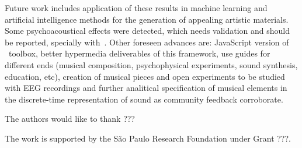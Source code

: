 Future work includes application of these results in machine learning and artificial intelligence 
methods for the generation of appealing artistic materials. Some psychoacoustical effects were detected,
which needs validation and should be reported, specially with~\cite{quadrosSonoros}. Other foreseen advances
are: JavaScript version of \massa\ toolbox, better hypermedia deliverables of this framework, use guides
for different ends (musical composition, psychophysical experiments, sound synthesis, education, etc), creation
of musical pieces and open experiments to be studied with EEG recordings and further analitical specification of musical
elements in the discrete-time representation of sound as community feedback corroborate. 

\begin{acks}

The authors would like to thank ???

The work is supported by the São Paulo Research Foundation under Grant ???.
\end{acks}


% 

